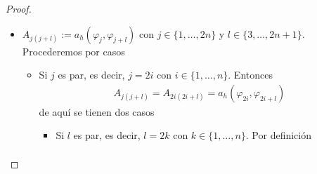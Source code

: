 \documentclass[10pt,a4paper]{report}
\newcommand{\dx}{\textup{d}x}
\providecommand{\Dx}[1]{\frac{\textup{d} #1}{\textup{d}x}}
\providecommand{\salto}[1]{\left\llbracket#1\right\rrbracket}
\providecommand{\prom}[1]{\left \{\!\left \{#1\right \}\!\right \}}
\begin{document}
\begin{proof}
\begin{itemize}
\begin{itemize}
\begin{align*}
            		           &= -\frac{1}{2h}
            	\end{align*}
            	\item Si $j$ es impar, es decir, $j = 2i-1$ con $i\in\{1,\dots,n\}$. Por definición
            	\begin{align*}
            		A_{j(j+2)} &= A_{(2i-1) (2i+1)}\\ 
            		           &:= a_{h}(\varphi_{2i-1},\varphi_{2i+1})\\ 
            		           &= a_{h}(\phi^{i}_{1},\phi^{i+1}_{1})\\
            		           &= \int_{a}^{b} \Dx{\phi^{i}_{1}}(x)\Dx{\phi^{i+1}_{1}}(x)\ \dx - \sum_{l=1}^{n}\Big(\salto{\phi^{i}_{1}(x_{l})}\prom{\Dx{\phi^{i+1}_{1}}(x_{l})} + \prom{\Dx{\phi^{i}_{1}}(x_{l})}\salto{\phi^{i+1}_{1}(x_{l})}\Big)\\
            		           &-\Dx{\phi^{i}_{1}}(b)\phi^{i+1}_{1}(b) + \Dx{\phi^{i}_{1}}(a)\phi^{i+1}_{1}(a) - \phi^{i}_{1}(b)\Dx{\phi^{i+1}_{1}}(b) + \phi^{i}_{1}(a)\Dx{\phi^{i+1}_{1}}(a) + \sum_{l=1}^{n}\gamma h^{-1}\salto{\phi^{i}_{1}(x_{l})}\salto{\phi^{i+1}_{1}(x_{l})}\\
            		           &+ \gamma h^{-1}\phi^{i}_{1}(a)\phi^{i+1}_{1}(a) + \gamma h^{-1}\phi^{i}_{1}(b)\phi^{i+1}_{1}(b)\\
            		           &= -\prom{\Dx{\phi^{i}_{1}}(x_{i})}\salto{\phi^{i+1}_{1}(x_{i})}\\
            		           &= -\frac{1}{2h}
            	\end{align*}
            \end{itemize}
        \item  $A_{j(j+l)} := a_{h}\left( \varphi_{j},\varphi_{j+l}\right)$ con $j\in\{1,\dots,2n\}$ y $l\in\{3,\dots,2n+1\}$.\\
        Procederemos por casos
        \begin{itemize}
        	\item Si $j$ es par, es decir, $j = 2i$ con $i\in\{1,\dots,n\}$. Entonces 
        	\begin{align*}
        		A_{j(j+l)} = A_{2i(2i+l)} = a_{h}(\varphi_{2i},\varphi_{2i+l})
        	\end{align*}
            de aquí se tienen dos casos
        	\begin{itemize}
        		\item Si $l$ es par, es decir, $l = 2k$ con $k\in\{1,\dots,n\}$. Por definición
        		\begin{align*}

\end{align*}
\end{itemize}
\end{itemize}
\end{itemize}
\end{proof}
\end{document}
